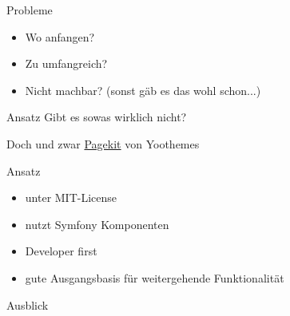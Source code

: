 \documentclass{beamer}
\begin{document}
	\begin{frame}{Probleme}
		\begin{itemize}
			\item Wo anfangen?
			\item Zu umfangreich?
			\item Nicht machbar? (sonst gäb es das wohl schon...)
		\end{itemize}
	\end{frame}
	
	\begin{frame}{Ansatz}
		\centering
		Gibt es sowas wirklich nicht?
		
		 {Doch und zwar \href{http://www.pagekit.com}{Pagekit} von Yoothemes}
	\end{frame}
	\begin{frame}{Ansatz}
		\begin{itemize}
			\item unter MIT-License
			\item nutzt Symfony Komponenten
			\item Developer first
			\item gute Ausgangsbasis für weitergehende Funktionalität
		\end{itemize}
	\end{frame}
	
	\begin{frame}{Ausblick}
		
	\end{frame}
\end{document}

